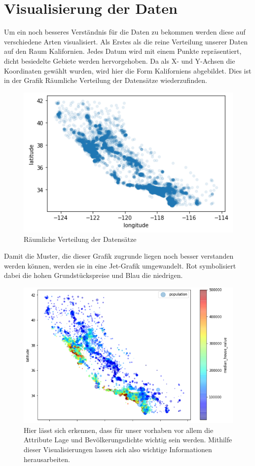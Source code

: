 \section{Visualisierung der Daten}
\label{visualisierungDerDaten}
Um ein noch besseres Verständnis für die Daten zu bekommen werden diese auf verschiedene Arten visualisiert. Als Erstes als die reine Verteilung unserer Daten auf den Raum Kalifornien. Jedes Datum wird mit einem Punkte repräsentiert, dicht besiedelte Gebiete werden hervorgehoben. Da als X- und Y-Achsen die Koordinaten gewählt wurden, wird hier die Form Kaliforniens abgebildet. Dies ist in der Grafik Räumliche Verteilung der Datensätze wiederzufinden.
\begin{figure}
	\includegraphics[width=1.0\textwidth]{../Bilder/pasted image 0 (11).png}
	\caption{Räumliche Verteilung der Datensätze}
\end{figure}

Damit die Muster, die dieser Grafik zugrunde liegen noch besser verstanden werden können, werden sie in eine Jet-Grafik umgewandelt. Rot symbolisiert dabei die hohen Grundstückspreise und Blau die niedrigen.

\begin{figure}
	\includegraphics[width=1.0\textwidth]{../Bilder/pasted image 0.png}
	\caption{Hier lässt sich erkennen, dass für unser vorhaben vor allem die Attribute Lage und Bevölkerungsdichte wichtig sein werden. Mithilfe dieser Visualisierungen lassen sich also wichtige Informationen herausarbeiten.
}
\end{figure}


